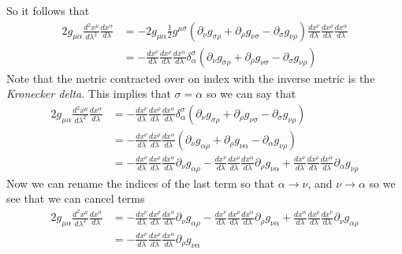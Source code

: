 \documentclass[11pt]{article}
\numberwithin{equation}{section}
\begin{document}
\begin{enumerate}[(a)]
So it follows that
\begin{align*}
2g_{\mu\alpha}\frac{d^2x^{\mu}}{d\lambda^2}\frac{dx^{\alpha}}{d\lambda} &= -2g_{\mu\alpha}\frac{1}{2}g^{\mu\sigma}\left(\partial_{\nu}g_{\sigma\rho} + \partial_{\rho}g_{\nu\sigma} - \partial_{\sigma}g_{\nu\rho}\right)\frac{dx^{\nu}}{d\lambda}\frac{dx^{\rho}}{d\lambda}\frac{dx^{\alpha}}{d\lambda}\\
&= -\frac{dx^{\nu}}{d\lambda}\frac{dx^{\rho}}{d\lambda}\frac{dx^{\alpha}}{d\lambda}\delta_{\alpha}^{\sigma}\left(\partial_{\nu}g_{\sigma\rho} + \partial_{\rho}g_{\nu\sigma} - \partial_{\sigma}g_{\nu\rho}\right)
\end{align*}
Note that the metric contracted over on index with the inverse metric is the \emph{Kronecker delta}. This implies that $\sigma = \alpha$ so we can say that
\begin{align*}
2g_{\mu\alpha}\frac{d^2x^{\mu}}{d\lambda^2}\frac{dx^{\alpha}}{d\lambda} &= -\frac{dx^{\nu}}{d\lambda}\frac{dx^{\rho}}{d\lambda}\frac{dx^{\alpha}}{d\lambda}\delta_{\alpha}^{\sigma}\left(\partial_{\nu}g_{\sigma\rho} + \partial_{\rho}g_{\nu\sigma} - \partial_{\sigma}g_{\nu\rho}\right)\\
&=  -\frac{dx^{\nu}}{d\lambda}\frac{dx^{\rho}}{d\lambda}\frac{dx^{\alpha}}{d\lambda}\left(\partial_{\nu}g_{\alpha\rho} + \partial_{\rho}g_{\nu\alpha} - \partial_{\alpha}g_{\nu\rho}\right)\\
&=  -\frac{dx^{\nu}}{d\lambda}\frac{dx^{\rho}}{d\lambda}\frac{dx^{\alpha}}{d\lambda}\partial_{\nu}g_{\alpha\rho} - \frac{dx^{\nu}}{d\lambda}\frac{dx^{\rho}}{d\lambda}\frac{dx^{\alpha}}{d\lambda}\partial_{\rho}g_{\nu\alpha} + \frac{dx^{\nu}}{d\lambda}\frac{dx^{\rho}}{d\lambda}\frac{dx^{\alpha}}{d\lambda}\partial_{\alpha}g_{\nu\rho}
\end{align*}
Now we can rename the indices of the last term so that $\alpha\rightarrow\nu$, and $\nu\rightarrow\alpha$ so we see that we can cancel terms
\begin{align*}
2g_{\mu\alpha}\frac{d^2x^{\mu}}{d\lambda^2}\frac{dx^{\alpha}}{d\lambda} &=  -\frac{dx^{\nu}}{d\lambda}\frac{dx^{\rho}}{d\lambda}\frac{dx^{\alpha}}{d\lambda}\partial_{\nu}g_{\alpha\rho} - \frac{dx^{\nu}}{d\lambda}\frac{dx^{\rho}}{d\lambda}\frac{dx^{\alpha}}{d\lambda}\partial_{\rho}g_{\nu\alpha} + \frac{dx^{\alpha}}{d\lambda}\frac{dx^{\rho}}{d\lambda}\frac{dx^{\nu}}{d\lambda}\partial_{\nu}g_{\alpha\rho}\\
&=  -\frac{dx^{\nu}}{d\lambda}\frac{dx^{\rho}}{d\lambda}\frac{dx^{\alpha}}{d\lambda}\partial_{\rho}g_{\nu\alpha} 
\end{align*}

\end{enumerate}
\end{document}
